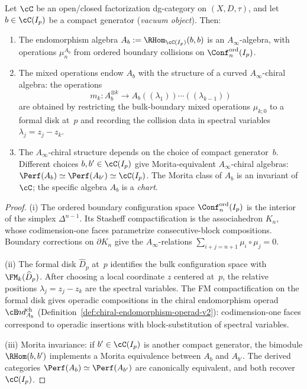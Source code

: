 \begin{theorem}
\label{thm:boundary-algebra-from-vacuum-v2}
Let $\cC$ be an open/closed factorization dg-category on
$(X, D, \tau)$, and let $b \in \cC(I_p)$ be a compact generator
(\emph{vacuum object}). Then:
\begin{enumerate}[label=\textup{(\roman*)}]
\item The endomorphism algebra
 $A_b := \RHom_{\cC(I_p)}(b, b)$
 is an $A_\infty$-algebra, with operations
 $\mu_n^{A_b}$ from ordered boundary collisions on
 $\Conf_n^{\mathrm{ord}}(I_p)$.

\item The mixed operations endow $A_b$ with the structure of a
 curved $A_\infty$-chiral algebra: the operations
 \[
 m_k \colon A_b^{\otimes k} \to
 A_b((\lambda_1))\cdots((\lambda_{k-1}))
 \]
 are obtained by restricting the bulk-boundary mixed operations
 $\mu_{k;0}$ to a formal disk at~$p$ and recording the collision
 data in spectral variables $\lambda_j = z_j - z_k$.

\item The $A_\infty$-chiral structure depends on the choice of
 compact generator~$b$. Different choices
 $b, b' \in \cC(I_p)$ give Morita-equivalent $A_\infty$-chiral
 algebras:
 $\Perf(A_b) \simeq \Perf(A_{b'}) \simeq \cC(I_p)$.
 The Morita class of $A_b$ is an invariant of $\cC$; the specific
 algebra $A_b$ is a \emph{chart}.
\end{enumerate}
\end{theorem}

\begin{proof}
(i) The ordered boundary configuration space
$\Conf_n^{\mathrm{ord}}(I_p)$ is the interior of the simplex
$\Delta^{n-1}$. Its Stasheff compactification is the associahedron
$K_n$, whose codimension-one faces parametrize consecutive-block
compositions. Boundary corrections on $\partial K_n$ give the
$A_\infty$-relations $\sum_{i+j=n+1} \mu_i \circ \mu_j = 0$.

(ii) The formal disk $\widehat{D}_p$ at~$p$ identifies the bulk
configuration space with $\FM_k(\widehat{D}_p)$. After choosing a
local coordinate $z$ centered at~$p$, the relative positions
$\lambda_j = z_j - z_k$ are the spectral variables. The FM
compactification on the formal disk gives operadic compositions in
the chiral endomorphism operad $\cE\!nd^{\mathrm{ch}}_{A_b}$
(Definition~\ref{def:chiral-endomorphism-operad-v2}): codimension-one
faces correspond to operadic insertions with block-substitution
of spectral variables.

(iii) Morita invariance: if $b' \in \cC(I_p)$ is another compact
generator, the bimodule $\RHom(b, b')$ implements a Morita
equivalence between $A_b$ and $A_{b'}$. The derived categories
$\Perf(A_b) \simeq \Perf(A_{b'})$ are canonically equivalent,
and both recover $\cC(I_p)$.
\end{proof}


